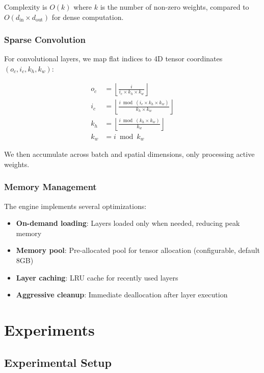 \documentclass[11pt]{article}
\begin{document}
Complexity is $O(k)$ where $k$ is the number of non-zero weights, compared to $O(d_{\text{in}} \times d_{\text{out}})$ for dense computation.

\subsubsection{Sparse Convolution}

For convolutional layers, we map flat indices to 4D tensor coordinates $(o_c, i_c, k_h, k_w)$:

\begin{align}
o_c &= \left\lfloor \frac{i}{i_c \times k_h \times k_w} \right\rfloor \\
i_c &= \left\lfloor \frac{i \bmod (i_c \times k_h \times k_w)}{k_h \times k_w} \right\rfloor \\
k_h &= \left\lfloor \frac{i \bmod (k_h \times k_w)}{k_w} \right\rfloor \\
k_w &= i \bmod k_w
\end{align}

We then accumulate across batch and spatial dimensions, only processing active weights.

\subsubsection{Memory Management}

The engine implements several optimizations:

\begin{itemize}
    \item \textbf{On-demand loading}: Layers loaded only when needed, reducing peak memory
    \item \textbf{Memory pool}: Pre-allocated pool for tensor allocation (configurable, default 8GB)
    \item \textbf{Layer caching}: LRU cache for recently used layers
    \item \textbf{Aggressive cleanup}: Immediate deallocation after layer execution
\end{itemize}

\section{Experiments}

\subsection{Experimental Setup}
\end{document}
